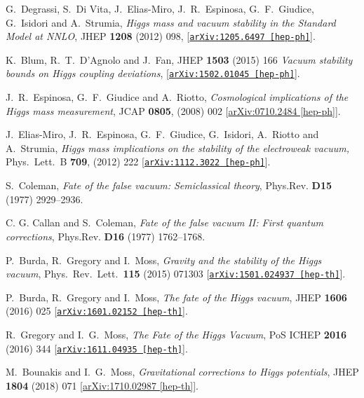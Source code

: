 \documentclass{PoS}
\begin{document}
\begin{thebibliography}{99}
G.~Degrassi, S.~Di Vita, J.~Elias-Miro, J.~R.~Espinosa, 
G.~F.~Giudice, G.~Isidori and A.~Strumia,
{\it {Higgs mass and vacuum stability in the Standard Model at NNLO}},  
JHEP {\bf 1208} (2012) 098,
[\href{http://xxx.lanl.gov/abs/1205.6497}{{\tt arXiv:1205.6497 [hep-ph]}}].

K.~Blum, R.~T.~D'Agnolo and J.~Fan,
JHEP {\bf 1503} (2015) 166
{\it {Vacuum stability bounds on Higgs coupling deviations}},  
[\href{http://xxx.lanl.gov/abs/1502.01045}{{\tt arXiv:1502.01045 [hep-ph]}}].

  J.~R.~Espinosa, G.~F.~Giudice and A.~Riotto,
  {\it Cosmological implications of the Higgs mass measurement},
  JCAP {\bf 0805},  (2008) 002
  [\href{http://arxiv.org/abs/arXiv:0710.2484}{arXiv:0710.2484 [hep-ph]}].


J.~Elias-Miro, J.~R.~Espinosa, G.~F.~Giudice, G.~Isidori, A.~Riotto and A.~Strumia,
{\it Higgs mass implications on the stability of the electroweak vacuum,}
Phys.\ Lett.\ B {\bf 709},  (2012) 222
[\href{http://xxx.lanl.gov/abs/1112.3022}{{\tt arXiv:1112.3022 [hep-ph]}}].

S.~Coleman, 
{\it {Fate of the false vacuum: Semiclassical theory}},  
Phys.Rev. {\bf D15} (1977) 2929--2936.

C. G. Callan and S.~Coleman,
{\it {Fate of the false vacuum II: First quantum corrections}},  
Phys.Rev. {\bf D16} (1977) 1762--1768.

P.~Burda, R.~Gregory and I.~Moss,
{\it Gravity and the stability of the Higgs vacuum},
Phys.\ Rev.\ Lett.\  {\bf 115}  (2015) 071303
[\href{http://xxx.lanl.gov/abs/1501.04937}{{\tt arXiv:1501.024937 [hep-th]}}].


P.~Burda, R.~Gregory and I.~Moss,
{\it The fate of the Higgs vacuum},
JHEP {\bf 1606} (2016) 025 
[\href{http://xxx.lanl.gov/abs/1601.02152}{{\tt arXiv:1601.02152 [hep-th]}}].

R.~Gregory and I.~G.~Moss,
{\it The Fate of the Higgs Vacuum},
PoS ICHEP {\bf 2016} (2016) 344
[\href{http://xxx.lanl.gov/abs/1611.04935}{{\tt arXiv:1611.04935 [hep-th]}}].

  M.~Bounakis and I.~G.~Moss,
  {\it Gravitational corrections to Higgs potentials},
  JHEP {\bf 1804}  (2018) 071
  [\href{http://arxiv.org/abs/arXiv:1710.02987}{arXiv:1710.02987 [hep-th]}].


\end{thebibliography}
\end{document}

